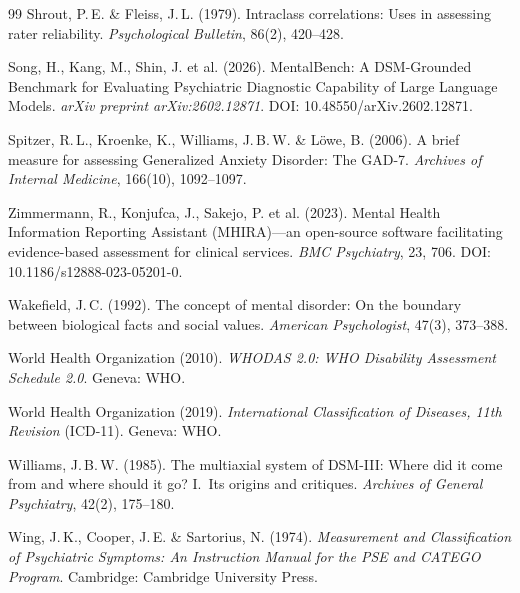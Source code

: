 \documentclass[11pt,a4paper]{article}
\begin{document}
\begin{thebibliography}{99}
Shrout, P.\,E. \& Fleiss, J.\,L. (1979).
\newblock Intraclass correlations: Uses in assessing rater reliability.
\newblock \textit{Psychological Bulletin}, 86(2), 420--428.

Song, H., Kang, M., Shin, J. et al. (2026).
\newblock MentalBench: A DSM-Grounded Benchmark for Evaluating Psychiatric Diagnostic Capability of Large Language Models.
\newblock \textit{arXiv preprint arXiv:2602.12871}. DOI: 10.48550/arXiv.2602.12871.

Spitzer, R.\,L., Kroenke, K., Williams, J.\,B.\,W. \& L\"owe, B. (2006).
\newblock A brief measure for assessing Generalized Anxiety Disorder: The GAD-7.
\newblock \textit{Archives of Internal Medicine}, 166(10), 1092--1097.

Zimmermann, R., Konjufca, J., Sakejo, P. et al. (2023).
\newblock Mental Health Information Reporting Assistant (MHIRA)---an open-source software facilitating evidence-based assessment for clinical services.
\newblock \textit{BMC Psychiatry}, 23, 706. DOI: 10.1186/s12888-023-05201-0.

Wakefield, J.\,C. (1992).
\newblock The concept of mental disorder: On the boundary between biological facts and social values.
\newblock \textit{American Psychologist}, 47(3), 373--388.

World Health Organization (2010).
\newblock \textit{WHODAS 2.0: WHO Disability Assessment Schedule 2.0}.
\newblock Geneva: WHO.

World Health Organization (2019).
\newblock \textit{International Classification of Diseases, 11th Revision} (ICD-11).
\newblock Geneva: WHO.

Williams, J.\,B.\,W. (1985).
\newblock The multiaxial system of DSM-III: Where did it come from and where should it go? I.\ Its origins and critiques.
\newblock \textit{Archives of General Psychiatry}, 42(2), 175--180.

Wing, J.\,K., Cooper, J.\,E. \& Sartorius, N. (1974).
\newblock \textit{Measurement and Classification of Psychiatric Symptoms: An Instruction Manual for the PSE and CATEGO Program}.
\newblock Cambridge: Cambridge University Press.
\end{thebibliography}
\end{document}
